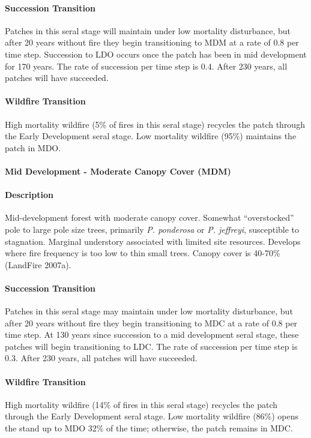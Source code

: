 \paragraph*{Succession Transition} Patches in this seral stage will maintain under low mortality disturbance, but after 20 years without fire they begin transitioning to MDM at a rate of 0.8 per time step. Succession to LDO occurs once the patch has been in mid development for 170 years. The rate of succession per time step is 0.4. After 230 years, all patches will have succeeded.

\paragraph*{Wildfire Transition} High mortality wildfire (5\% of fires in this seral stage) recycles the patch through the Early Development seral stage. Low mortality wildfire (95\%) maintains the patch in MDO.

\noindent\hrulefill

\paragraph*{Mid Development - Moderate Canopy Cover (MDM)}

\paragraph*{Description} Mid-development forest with moderate canopy cover. Somewhat ``overstocked'' pole to large pole size trees, primarily \emph{P. ponderosa} or \emph{P. jeffreyi}, susceptible to stagnation. Marginal understory associated with limited site resources. Develops where fire frequency is too low to thin small trees. Canopy cover is 40-70\% (LandFire 2007a).

\paragraph*{Succession Transition} Patches in this seral stage may maintain under low mortality disturbance, but after 20 years without fire they begin transitioning to MDC at a rate of 0.8 per time step. At 130 years since succession to a mid development seral stage, these patches will begin transitioning to LDC. The rate of succession per time step is 0.3. After 230 years, all patches will have succeeded.

\paragraph*{Wildfire Transition} High mortality wildfire (14\% of fires in this seral stage) recycles the patch through the Early Development seral stage. Low mortality wildfire (86\%) opens the stand up to MDO 32\% of the time; otherwise, the patch remains in MDC.

